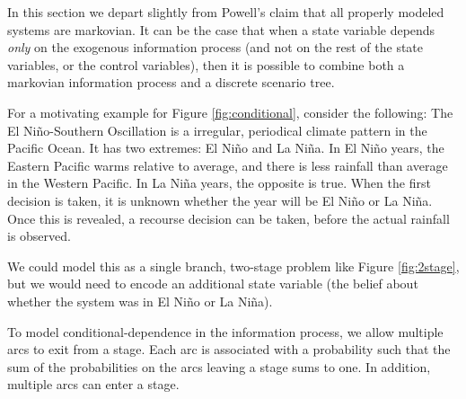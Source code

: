 \documentclass[final,1p,times]{elsarticle}
\begin{document}
In this section we depart slightly from Powell's claim that all properly modeled systems are markovian. It can be the case that when a state variable depends \emph{only} on the exogenous information process (and not on the rest of the state variables, or the control variables), then it is possible to combine both a markovian information process and a discrete scenario tree.

For a motivating example for Figure \ref{fig:conditional}, consider the following: The El Ni\~no-Southern Oscillation is a irregular, periodical climate pattern in the Pacific Ocean. It has two extremes: El Ni\~no and La Ni\~na. In El Ni\~no years, the Eastern Pacific warms relative to average, and there is less rainfall than average in the Western Pacific. In La Ni\~na years, the opposite is true. When the first decision is taken, it is unknown whether the year will be El Ni\~no or La Ni\~na. Once this is revealed, a recourse decision can be taken, before the actual rainfall is observed. 

We could model this as a single branch, two-stage problem like Figure \ref{fig:2stage}, but we would need to encode an additional state variable (the belief about whether the system was in El Ni\~no or La Ni\~na).

To model conditional-dependence in the information process, we allow multiple arcs to exit from a stage. Each arc is associated with a probability such that the sum of the probabilities on the arcs leaving a stage sums to one. In addition, multiple arcs can enter a stage.



    
\end{document}
